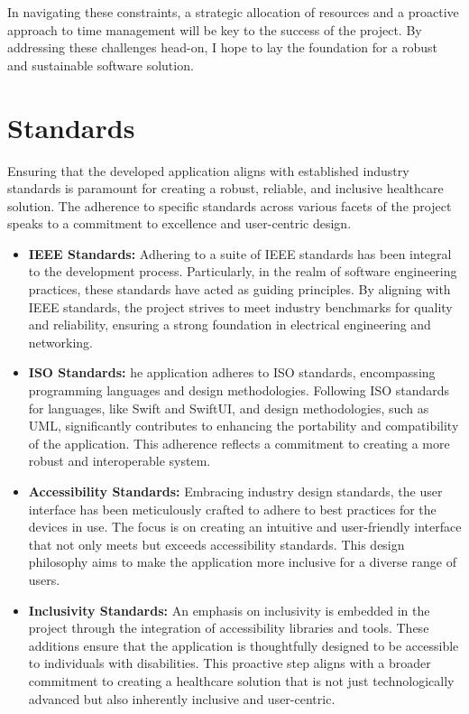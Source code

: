 In navigating these constraints, a strategic allocation of resources and a proactive approach to time management will be key to the success of the project. By addressing these challenges head-on, I hope to lay the foundation for a robust and sustainable software solution.

\section{Standards}

Ensuring that the developed application aligns with established industry standards is paramount for creating a robust, reliable, and inclusive healthcare solution. The adherence to specific standards across various facets of the project speaks to a commitment to excellence and user-centric design.

\begin{itemize}
    \item \textbf{IEEE Standards:} Adhering to a suite of IEEE standards has been integral to the development process. Particularly, in the realm of software engineering practices, these standards have acted as guiding principles. By aligning with IEEE standards, the project strives to meet industry benchmarks for quality and reliability, ensuring a strong foundation in electrical engineering and networking.
    \item \textbf{ISO Standards:} he application adheres to ISO standards, encompassing programming languages and design methodologies. Following ISO standards for languages, like Swift and SwiftUI, and design methodologies, such as UML, significantly contributes to enhancing the portability and compatibility of the application. This adherence reflects a commitment to creating a more robust and interoperable system.
    \item \textbf{Accessibility Standards:} Embracing industry design standards, the user interface has been meticulously crafted to adhere to best practices for the devices in use. The focus is on creating an intuitive and user-friendly interface that not only meets but exceeds accessibility standards. This design philosophy aims to make the application more inclusive for a diverse range of users.
    \item \textbf{Inclusivity Standards:} An emphasis on inclusivity is embedded in the project through the integration of accessibility libraries and tools. These additions ensure that the application is thoughtfully designed to be accessible to individuals with disabilities. This proactive step aligns with a broader commitment to creating a healthcare solution that is not just technologically advanced but also inherently inclusive and user-centric.
\end{itemize}